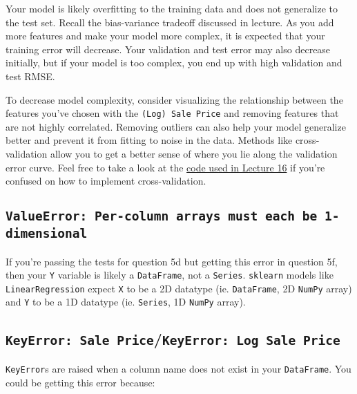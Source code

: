\documentclass[
  letterpaper,
  DIV=11,
  numbers=noendperiod]{scrreprt}
\begin{document}
Your model is likely overfitting to the training data and does not
generalize to the test set. Recall the bias-variance tradeoff discussed
in lecture. As you add more features and make your model more complex,
it is expected that your training error will decrease. Your validation
and test error may also decrease initially, but if your model is too
complex, you end up with high validation and test RMSE.

To decrease model complexity, consider visualizing the relationship
between the features you've chosen with the \texttt{(Log)\ Sale\ Price}
and removing features that are not highly correlated. Removing outliers
can also help your model generalize better and prevent it from fitting
to noise in the data. Methods like cross-validation allow you to get a
better sense of where you lie along the validation error curve. Feel
free to take a look at the
\href{https://ds100.org/sp24/resources/assets/lectures/lec16/lec16.html}{code
used in Lecture 16} if you're confused on how to implement
cross-validation.

\subsection{\texorpdfstring{\texttt{ValueError:\ Per-column\ arrays\ must\ each\ be\ 1-dimensional}}{ValueError: Per-column arrays must each be 1-dimensional}}\label{valueerror-per-column-arrays-must-each-be-1-dimensional}

If you're passing the tests for question 5d but getting this error in
question 5f, then your \texttt{Y} variable is likely a
\texttt{DataFrame}, not a \texttt{Series}. \texttt{sklearn} models like
\texttt{LinearRegression} expect \texttt{X} to be a 2D datatype (ie.
\texttt{DataFrame}, 2D \texttt{NumPy} array) and \texttt{Y} to be a 1D
datatype (ie. \texttt{Series}, 1D \texttt{NumPy} array).

\subsection{\texorpdfstring{\texttt{KeyError:\ \textquotesingle{}Sale\ Price\textquotesingle{}}/\texttt{KeyError:\ \textquotesingle{}Log\ Sale\ Price\textquotesingle{}}}{KeyError: \textquotesingle Sale Price\textquotesingle/KeyError: \textquotesingle Log Sale Price\textquotesingle{}}}\label{keyerror-sale-pricekeyerror-log-sale-price}

\texttt{KeyError}s are raised when a column name does not exist in your
\texttt{DataFrame}. You could be getting this error because:
\end{document}

